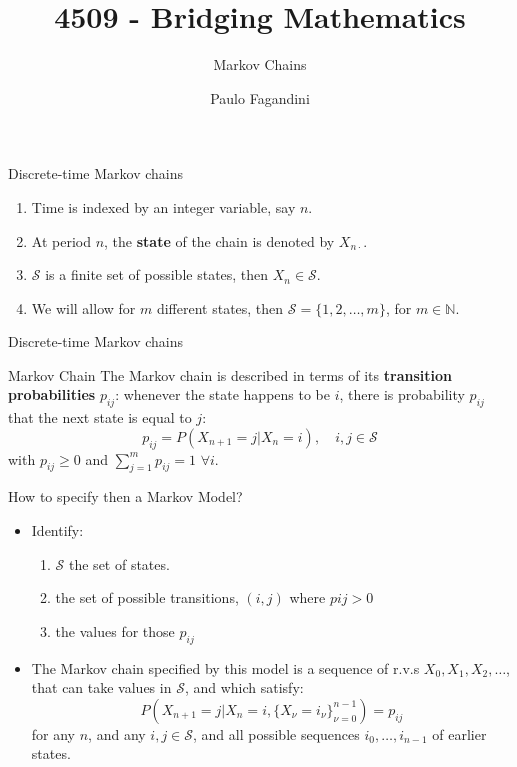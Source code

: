 \documentclass[aspectratio=169]{beamer}
\title[]{4509 - Bridging Mathematics}
\subtitle{Markov Chains}
\author[P. Fagandini]{Paulo Fagandini}
\institute{}
\date{}
\begin{document}
\begin{frame}{Discrete-time Markov chains}
    \begin{enumerate}
        \item Time is indexed by an integer variable, say $n$.
        \item At period $n$, the \textbf{state} of the chain is denoted by $X_{n\cdot}$.
        \item $\mathcal{S}$ is a finite set of possible states, then $X_n\in\mathcal{S}$.
        \item We will allow for $m$ different states, then $\mathcal{S}=\{1,2,\hdots,m\}$, for $m\in\mathds{N}$.
    \end{enumerate}
\end{frame}

\begin{frame}{Discrete-time Markov chains}
    \begin{definition}{Markov Chain}
        The Markov chain is described in terms of its \textbf{transition probabilities} $p_{ij}$:
        whenever the state happens to be $i$, there is probability $p_{ij}$ that the next state is
        equal to $j$:
        \[p_{ij}=P(X_{n+1}=j|X_n=i), \quad i,j\in\mathcal{S}\]
        with $p_{ij}\geq 0$ and $\sum_{j=1}^m p_{ij}=1$ $\forall i$.
    \end{definition}    

    \vspace{1em}

\end{frame}

\begin{frame}
    How to specify then a Markov Model?
    \begin{itemize}
        \item Identify:
            \begin{enumerate}
                \item $\mathcal{S}$ the set of states.
                \item the set of possible transitions, $(i,j)$ where $p{ij}>0$
                \item the values for those $p_{ij}$
            \end{enumerate}
        \item The Markov chain specified by this model is a sequence of r.v.s $X_0,X_1,X_2,\hdots$, that
              can take values in $\mathcal{S}$, and which satisfy:
              \[P(X_{n+1}=j|X_n=i, \{X_{\nu}=i_{\nu}\}_{\nu=0}^{n-1})=p_{ij}\] for any $n$, and any $i,j\in\mathcal{S}$,
              and all possible sequences $i_0,\hdots,i_{n-1}$ of earlier states.
    \end{itemize}
\end{frame}
\end{document}
